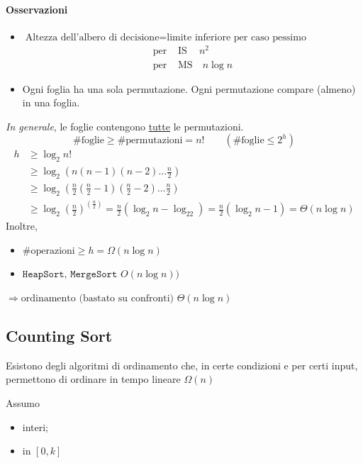 \paragraph{Osservazioni}
\begin{itemize}
	\item $ \text{Altezza dell'albero di decisione} = \text{limite inferiore per caso pessimo}$
	\begin{align*}
	    \text{per }& \text{IS} \ \quad n^2 \\
	    \text{per }& \text{MS} \quad n \log n
	\end{align*}
	\item Ogni foglia ha una sola permutazione. Ogni permutazione compare (almeno) in una foglia.
\end{itemize}

\emph{In generale}, le foglie contengono \underline{tutte} le permutazioni.
$$ \text{\# foglie} \geq \text{\# permutazioni} = n! \qquad ( \text{\# foglie} \leq 2^h)$$
\begin{align*}
    h & \geq \log_2 n! \\
    & \geq \log_2 \left( n(n-1)(n-2) \dots \frac{n}{2}\right) \\
    & \geq \log_2 \left( \frac{n}{2}\left(\frac{n}{2}-1\right)\left(\frac{n}{2}-2\right) \dots \frac{n}{2}\right) \\
    & \geq \log_2 \left( \frac{n}{2} \right)^{(\frac{n}{2})} 
        = \frac{n}{2} \left( \log_2 n - \log_22\right)
        = \frac{n}{2} (\log_2 n - 1) = \Theta (n \log n)
\end{align*}
Inoltre,
\begin{itemize}
	\item $ \text{\# operazioni} \geq h = \Omega (n \log n)$
	\item $ \texttt{HeapSort, MergeSort } O(n \log n))$ 
\end{itemize}
$\Rightarrow \text{ordinamento (bastato su confronti) } \Theta (n \log n)$

\subsection{Counting Sort}
Esistono degli algoritmi di ordinamento che, in certe condizioni e per certi input, permettono
di ordinare in tempo lineare $\Omega (n)$
\bigskip

Assumo
\begin{itemize}[label=$-$]
    \item interi;
    \item in $[0,k]$
\end{itemize}

